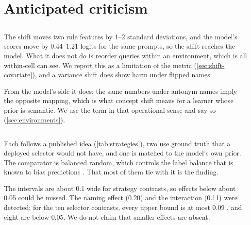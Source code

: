 \section{Anticipated criticism}
\label{sec:criticism}

\subsection*{}

{The shift moves two rule features by 1--2 standard deviations, and the model's scores move by 0.44--1.21 logits for the same prompts, so the shift reaches the model. What it does not do is reorder queries within an environment, which is all within-cell \AUROC can see. We report this as a limitation of the metric (\autoref{sec:shift-covariate}), and a variance shift does show harm under flipped names.}

{From the model's side it does: the same numbers under antonym names imply the opposite mapping, which is what concept shift means for a learner whose prior is semantic. We use the term in that operational sense and say so (\autoref{sec:environments}).}

\subsection*{}

{Each follows a published idea (\autoref{tab:strategies}), two use ground truth that a deployed selector would not have, and one is matched to the model's own prior. The comparator is balanced random, which controls the label balance that is known to bias predictions \citep{zhao2021calibrate}. That most of them tie with it is the finding.}

{The intervals are about 0.1 \AUROC wide for strategy contrasts, so effects below about 0.05 could be missed. The naming effect (0.20) and the interaction (0.11) were detected; for the ten selector contrasts, every upper bound is at most 0.09 \AUROC, and eight are below 0.05. We do not claim that smaller effects are absent.}

\subsection*{}

